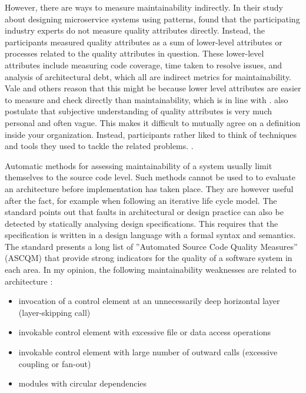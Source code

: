 \documentclass[utf8,english]{gradu3}
\begin{document}
However, there are ways to measure maintainability indirectly. In their study about
designing microservice systems using patterns, \textcite[9]{Vale2022} found that
the participating industry experts do not measure quality attributes directly.
Instead, the participants measured quality attributes as a sum of lower-level attributes or
processes related to the quality attributes in question. These lower-level
attributes include measuring code coverage, time taken to resolve issues, and
analysis of architectural debt, which all are indirect metrics for
maintainability. Vale and others reason that this might be because lower level
attributes are easier to measure and check directly than maintainability, which is
in line with \textcite{Arvanitou2017}. \textcite[9]{Vale2022}
also postulate that subjective understanding of quality attributes is very much
personal and often vague. This makes it difficult to mutually agree on a
definition inside your organization. Instead, participants rather liked to think
of techniques and tools they used to tackle the related problems.
\parencite[7-10]{Vale2022}.

Automatic methods for assessing maintainability of a system usually limit
themselves to the source code level. Such methods cannot be used to to evaluate
an architecture before implementation has taken place. They are however useful
after the fact, for example when following an iterative life cycle model.
The standard \textcite[1-2]{ISO5055} points out that faults in architectural or design practice
can also be detected by statically analysing design specifications. This
requires that the specification is written in a design language with a formal
syntax and semantics. The standard presents a long list of
''Automated Source Code Quality Measures'' (ASCQM) that provide strong
indicators for the quality of a software system in each area. In my opinion,
the following maintainability weaknesses are related to architecture
\parencite[38-47]{ISO5055}:
\begin{itemize}
  \item invocation of a control element at an unnecessarily deep horizontal
        layer (layer-skipping call)
  \item invokable control element with excessive file or data access operations
  \item invokable control element with large number of outward calls (excessive coupling
        or fan-out)
  \item modules with circular dependencies
\end{itemize}
\end{document}
